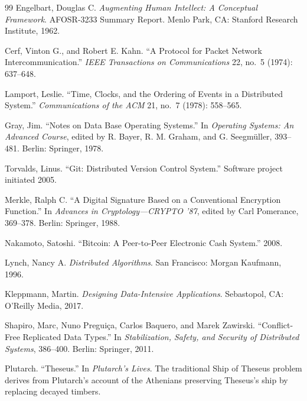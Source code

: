 \documentclass[
  11pt,
  a4paper,
  DIV=12,
  BCOR=0mm,
  parskip=half-
]{scrartcl}
\theoremstyle{definition}
\theoremstyle{plain}
\theoremstyle{remark}
\begin{document}
\begin{thebibliography}{99}
Engelbart, Douglas C.
\emph{Augmenting Human Intellect: A Conceptual Framework}.
AFOSR-3233 Summary Report.
Menlo Park, CA: Stanford Research Institute, 1962.

Cerf, Vinton G., and Robert E. Kahn.
``A Protocol for Packet Network Intercommunication.''
\emph{IEEE Transactions on Communications}
22, no.~5 (1974): 637--648.

Lamport, Leslie.
``Time, Clocks, and the Ordering of Events in a Distributed System.''
\emph{Communications of the ACM}
21, no.~7 (1978): 558--565.

Gray, Jim.
``Notes on Data Base Operating Systems.''
In \emph{Operating Systems: An Advanced Course},
edited by R. Bayer, R. M. Graham, and G. Seegm\"uller, 393--481.
Berlin: Springer, 1978.

Torvalds, Linus.
``Git: Distributed Version Control System.''
Software project initiated 2005.

Merkle, Ralph C.
``A Digital Signature Based on a Conventional Encryption Function.''
In \emph{Advances in Cryptology---CRYPTO '87},
edited by Carl Pomerance, 369--378.
Berlin: Springer, 1988.

Nakamoto, Satoshi.
``Bitcoin: A Peer-to-Peer Electronic Cash System.''
2008.

Lynch, Nancy A.
\emph{Distributed Algorithms}.
San Francisco: Morgan Kaufmann, 1996.

Kleppmann, Martin.
\emph{Designing Data-Intensive Applications}.
Sebastopol, CA: O'Reilly Media, 2017.

Shapiro, Marc, Nuno Pregui\c{c}a, Carlos Baquero, and Marek Zawirski.
``Conflict-Free Replicated Data Types.''
In \emph{Stabilization, Safety, and Security of Distributed Systems},
386--400.
Berlin: Springer, 2011.

Plutarch.
``Theseus.''
In \emph{Plutarch's Lives}.
The traditional Ship of Theseus problem derives from Plutarch's account of
the Athenians preserving Theseus's ship by replacing decayed timbers.

\end{thebibliography}

\end{document}
